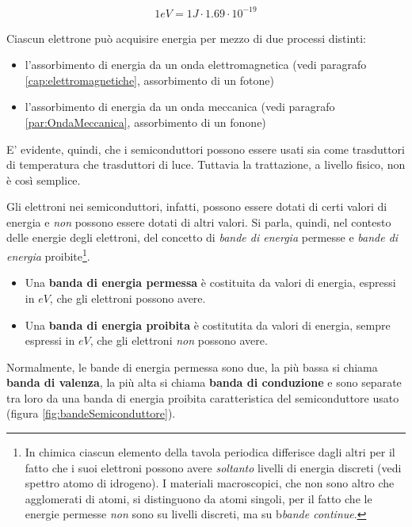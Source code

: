 \documentclass[17pt]{extarticle}
\begin{document}
\begin{eqnarray}
	1 eV = 1J\cdot 1.69\cdot 10^{-19}
\end{eqnarray}

Ciascun elettrone può acquisire energia per mezzo di due processi distinti: 
\begin{itemize}
	\item l'assorbimento di energia da un onda elettromagnetica (vedi paragrafo \ref{cap:elettromagnetiche}, assorbimento di un fotone)
	\item l'assorbimento di energia da un onda meccanica (vedi paragrafo \ref{par:OndaMeccanica}, assorbimento di un fonone)
\end{itemize}
 
E' evidente, quindi, che i semiconduttori possono essere usati sia come trasduttori di temperatura che trasduttori di luce.
Tuttavia la trattazione, a livello fisico, non è così semplice. 


Gli elettroni nei semiconduttori, infatti, possono essere dotati di certi valori di energia e \emph{non} possono essere dotati di altri valori. Si parla, quindi, nel contesto delle energie degli elettroni, del concetto di \emph{bande di energia} permesse e \emph{bande di energia} proibite\footnote{In chimica ciascun elemento della tavola periodica differisce dagli altri per il fatto che i suoi elettroni possono avere \emph{soltanto} livelli di energia discreti (vedi spettro atomo di idrogeno). I materiali macroscopici, che non sono altro che agglomerati di atomi, si distinguono da atomi singoli, per il fatto che le energie permesse \emph{non} sono su livelli discreti, ma su b\emph{bande continue}. }.


\begin{itemize}
	\item Una {\bf banda di energia permessa} è costituita da valori di energia, espressi in $eV$, che gli elettroni possono avere.
	\item Una {\bf banda di energia proibita} è costitutita da valori di energia, sempre espressi in $eV$, che gli elettroni \emph{non} possono avere.
\end{itemize}

Normalmente, le bande di energia permessa sono due, la più bassa si chiama {\bf banda di valenza}, la più alta si chiama {\bf banda di conduzione} e sono separate tra loro da una banda di energia proibita caratteristica del semiconduttore usato (figura \ref{fig:bandeSemiconduttore}).
\end{document}
